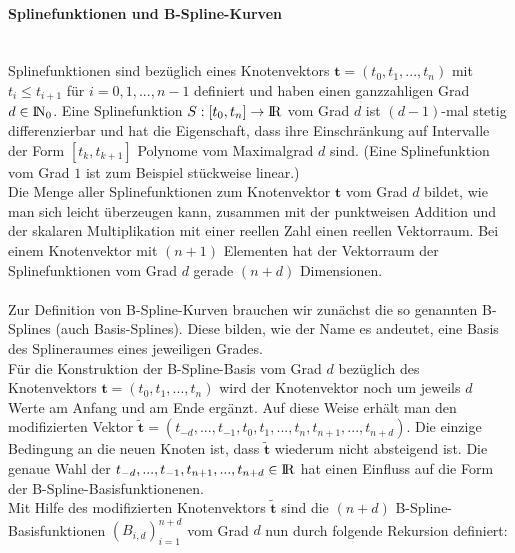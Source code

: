 \paragraph{Splinefunktionen und B-Spline-Kurven}~\\
Splinefunktionen sind bezüglich eines Knotenvektors $\mathbf{t}=(t_0,t_1,...,t_n)$ mit $t_i \le t_{i+1}$ für $i=0,1,...,n-1$ definiert und haben einen ganzzahligen Grad $d\in{\rm I\!N}_0$. Eine Splinefunktion $S:[t_0,t_n]\rightarrow{\rm I\!R}$ vom Grad $d$ ist $(d-1)$-mal stetig differenzierbar und hat die Eigenschaft, dass ihre Einschränkung auf Intervalle der Form $[t_k,t_{k+1}]$ Polynome vom Maximalgrad $d$ sind. (Eine Splinefunktion vom Grad $1$ ist zum Beispiel stückweise linear.)\\
Die Menge aller Splinefunktionen zum Knotenvektor $\mathbf{t}$ vom Grad $d$
bildet, wie man sich leicht überzeugen kann, zusammen mit der punktweisen Addition und der skalaren Multiplikation mit einer reellen Zahl einen reellen Vektorraum. Bei einem Knotenvektor mit $(n+1)$ Elementen hat der Vektorraum der Splinefunktionen vom Grad $d$ gerade $(n+d)$ Dimensionen.\\
\\
Zur Definition von B-Spline-Kurven brauchen wir zunächst die so genannten B-Splines (auch Basis-Splines). Diese bilden, wie der Name es andeutet, eine Basis des Splineraumes eines jeweiligen Grades.\\
Für die Konstruktion der B-Spline-Basis vom Grad $d$ bezüglich des Knotenvektors $\mathbf{t}=(t_0,t_1,...,t_n)$ wird der Knotenvektor noch um jeweils $d$ Werte am Anfang und am Ende ergänzt. Auf diese Weise erhält man den modifizierten Vektor $\mathbf{\tilde{t}}=(t_{-d},...,t_{-1},t_0,t_1,...,t_n,t_{n+1},...,t_{n+d})$. Die einzige Bedingung an die neuen Knoten ist, dass $\mathbf{\tilde{t}}$ wiederum nicht absteigend ist. Die genaue Wahl der $t_{-d},...,t_{-1},t_{n+1},...,t_{n+d}\in{\rm I\!R}$ hat einen Einfluss auf die Form der B-Spline-Basisfunktionenen.\\
Mit Hilfe des modifizierten Knotenvektors $\mathbf{\tilde{t}}$ sind die $(n+d)$ B-Spline-Basisfunktionen $(B_{i,d})_{i=1}^{n+d}$ vom Grad $d$ nun durch folgende Rekursion definiert:
